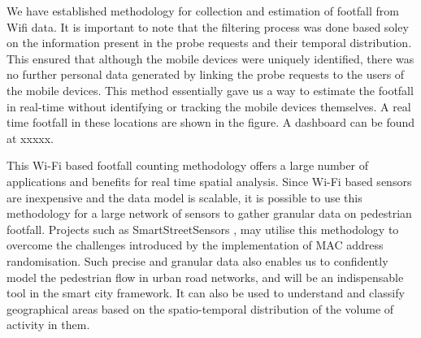 We have established methodology for collection and estimation of footfall from Wifi data.
It is important to note that the filtering process was done based soley on the information present in the probe requests and their temporal distribution.
This ensured that although the mobile devices were uniquely identified, there was no further personal data generated by linking the probe requests to the users of the mobile devices.
This method essentially gave us a way to estimate the footfall in real-time without identifying or tracking the mobile devices themselves. A real time footfall in these locations are shown in the figure.
A dashboard can be found at xxxxx.

This Wi-Fi based footfall counting methodology offers a large number of applications and benefits for real time spatial analysis.
Since Wi-Fi based sensors are inexpensive and the data model is scalable, it is possible to use this methodology for a large network of sensors to gather granular data on pedestrian footfall.
Projects such as SmartStreetSensors \citep{sss2016}, may utilise this methodology to overcome the challenges introduced by the implementation of MAC address randomisation.
Such precise and granular data also enables us to confidently model the pedestrian flow in urban road networks, and will be an indispensable tool in the smart city framework.
It can also be used to understand and classify geographical areas based on the spatio-temporal distribution of the volume of activity in them.
